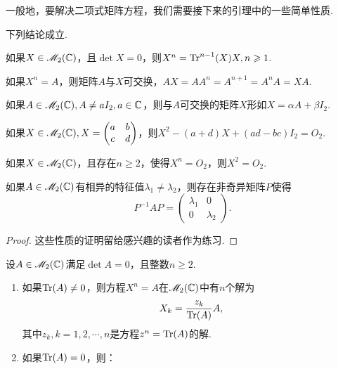 一般地，要解决二项式矩阵方程，我们需要接下来的引理中的一些简单性质.
\begin{lemma}
  下列结论成立.
  \begin{enum}
    \item\label{lemma3.2a} 如果$X\in\mathscr M_2(\mathbb C)$，且$\det X=0$，则$X^n=\operatorname{Tr}^{n-1}(X)X,n\geqslant1$.
    \item\label{lemma3.2b} 如果$X^n=A$，则矩阵$A$与$X$可交换，$AX=AA^n=A^{n+1}=A^nA=XA$.
    \item\label{lemma3.2c} 如果$A\in\mathscr M_2(\mathbb C),A\ne aI_2,a\in\mathbb C$，则与$A$可交换的矩阵$X$形如$X=\alpha A+\beta I_2$.
    \item\label{lemma3.2d} 如果$X\in\mathscr M_2(\mathbb C),X=\begin{pmatrix}
      a & b \\
      c & d
    \end{pmatrix}$，则$X^2-(a+d)X+(ad-bc)I_2=O_2$.
    \item\label{lemma3.2e} 如果$X\in\mathscr M_2(\mathbb C)$，且存在$n\ge2$，使得$X^n=O_2$，则$X^2=O_2$.
    \item\label{lemma3.2f} 如果$A\in\mathscr M_2(\mathbb C)$有相异的特征值$\lambda_1\ne\lambda_2$，则存在非奇异矩阵$P$使得
        \[
          P^{-1}AP = \begin{pmatrix}
            \lambda_1 & 0 \\
            0 & \lambda_2
          \end{pmatrix}.
        \]
  \end{enum}
\end{lemma}

\begin{proof}
  这些性质的证明留给感兴趣的读者作为练习.
\end{proof}

\begin{theorem}[满足$\det A=0$的方程$X^n=A,n\ge2,A\in\MM_2(\MC)$.]

设$A\in\mathscr M_2(\mathbb C)$满足$\det A=0$，且整数$n\ge2$.
\begin{enumerate}[left=0cm,label=(\arabic*)]
  \item 如果$\operatorname{Tr}(A)\ne0$，则方程$X^n=A$在$\mathscr M_2(\mathbb C)$中有$n$个解为
      \[
        X_k = \frac{z_k}{\operatorname{Tr}(A)}A,
      \]
      其中$z_k,k=1,2,\cdots,n$是方程$z^n=\operatorname{Tr}(A)$的解.
  \item 如果$\operatorname{Tr}(A)=0$，则：
\end{enumerate}

\end{theorem}

